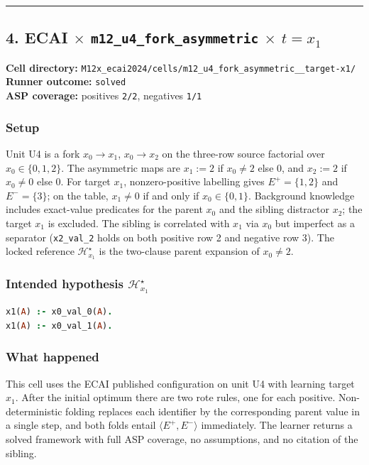 \documentclass[11pt]{article}
\begin{document}
\medskip\hrule\medskip

\subsection{\texorpdfstring{4. ECAI \(\times\) \texttt{m12\_u4\_fork\_asymmetric} \(\times\) \(t=x_1\)}{4. ECAI - m12-u4-fork-asymmetric - target x1}}

\textbf{Cell directory:} \texttt{M12x\_ecai2024/cells/m12\_u4\_fork\_asymmetric\_\_target-x1/}\\
\textbf{Runner outcome:} \texttt{solved}\\
\textbf{ASP coverage:} positives \texttt{2/2}, negatives \texttt{1/1}

\subsubsection{Setup}

Unit U4 is a fork \(x_0\to x_1\), \(x_0\to x_2\) on the three-row source factorial over \(x_0\in\{0,1,2\}\). The asymmetric maps are \(x_1:=2\) if \(x_0\neq 2\) else \(0\), and \(x_2:=2\) if \(x_0\neq 0\) else \(0\). For target \(x_1\), nonzero-positive labelling gives \(E^+=\{1,2\}\) and \(E^-=\{3\}\); on the table, \(x_1\neq 0\) if and only if \(x_0\in\{0,1\}\). Background knowledge includes exact-value predicates for the parent \(x_0\) and the sibling distractor \(x_2\); the target \(x_1\) is excluded. The sibling is correlated with \(x_1\) via \(x_0\) but imperfect as a separator (\texttt{x2\_val\_2} holds on both positive row 2 and negative row 3). The locked reference \(\mathcal{H}_{x_1}^\star\) is the two-clause parent expansion of \(x_0\neq 2\).

\subsubsection{\texorpdfstring{Intended hypothesis \(\mathcal{H}_{x_1}^\star\)}{Intended hypothesis H-star(x1)}}

\begin{lstlisting}[style=logic,language=Prolog]
x1(A) :- x0_val_0(A).
x1(A) :- x0_val_1(A).
\end{lstlisting}

\subsubsection{What happened}

This cell uses the ECAI published configuration on unit U4 with learning target \(x_1\). After the initial optimum there are two rote rules, one for each positive. Non-deterministic folding replaces each identifier by the corresponding parent value in a single step, and both folds entail \(\langle E^+,E^-\rangle\) immediately. The learner returns a solved framework with full ASP coverage, no assumptions, and no citation of the sibling.
\end{document}
